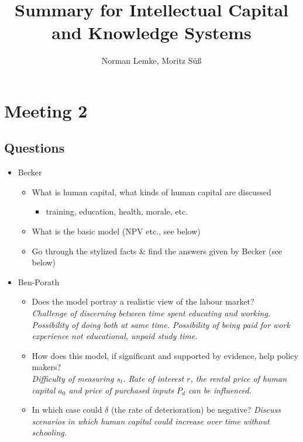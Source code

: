 \documentclass[12pt,a4paper]{article}
\author{Norman Lemke, Moritz Süß}
\begin{document}
  \title{Summary for Intellectual Capital and Knowledge Systems}
  \maketitle
  \tableofcontents
  \thispagestyle{empty}
  \pagebreak

  \section{Meeting 2} %
  \subsection{Questions} %
  \begin{itemize}
    \item Becker
      \begin{itemize}
        \item What is human capital, what kinds of human capital are discussed
          \begin{itemize}
            \item training, education, health, morale, etc.
          \end{itemize}
        \item What is the basic model (NPV etc., see below)
        \item Go through the stylized facts \& find the answers given by Becker (see below)
      \end{itemize}

    \item Ben-Porath
      \begin{itemize}
        \item Does the model portray a realistic view of the labour market? \\
          \emph{Challenge of discerning between time spent educating and working. Possibility of doing both at same time. Possibility of being paid for work experience not educational, unpaid study time.}
        \item How does this model, if significant and supported by evidence, help policy makers? \\
          \emph{Difficulty of measuring $s_t$. Rate of interest $r$, the rental price of human capital $a_0$ and price of purchased inputs $P_d$ can be influenced.}
        \item In which case could $\delta$ (the rate of deterioration) be negative?
          \emph{Discuss scenarios in which human capital could increase over time without schooling.}
      \end{itemize}


\end{itemize}
\end{document}
